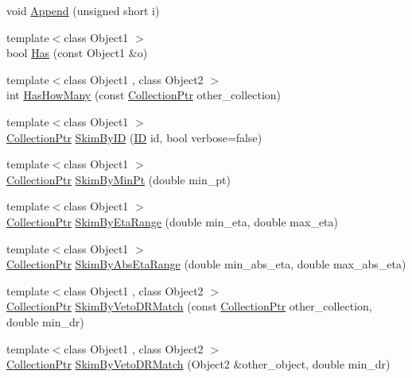 \begin{DoxyCompactItemize}
void \hyperlink{class_collection_a512ec1402a91a4af0ba696cc66f6f6fc}{Append} (unsigned short i)
\item 
{\footnotesize template$<$class Object1 $>$ }\\bool \hyperlink{class_collection_a91f8f35f3a94dc82013a979c52ab7e42}{Has} (const Object1 \&o)
\item 
{\footnotesize template$<$class Object1 , class Object2 $>$ }\\int \hyperlink{class_collection_ad01ea641d18de312338c07ce9ff1c109}{Has\+How\+Many} (const \hyperlink{_collection_8h_a64ea9217513944abee0afcb2ee82d787}{Collection\+Ptr} other\+\_\+collection)
\item 
{\footnotesize template$<$class Object1 $>$ }\\\hyperlink{_collection_8h_a64ea9217513944abee0afcb2ee82d787}{Collection\+Ptr} \hyperlink{class_collection_a1747c3817ab4fcf378c7cb90f4be59ca}{Skim\+By\+I\+D} (\hyperlink{_i_d_types_8h_a094c367727273b4da2b960ca3b3edc06}{I\+D} id, bool verbose=false)
\item 
{\footnotesize template$<$class Object1 $>$ }\\\hyperlink{_collection_8h_a64ea9217513944abee0afcb2ee82d787}{Collection\+Ptr} \hyperlink{class_collection_a5bcdc6dda7ac3de1789a93c9f7779883}{Skim\+By\+Min\+Pt} (double min\+\_\+pt)
\item 
{\footnotesize template$<$class Object1 $>$ }\\\hyperlink{_collection_8h_a64ea9217513944abee0afcb2ee82d787}{Collection\+Ptr} \hyperlink{class_collection_a5f1b6cfa200f5c288505983a678b5a96}{Skim\+By\+Eta\+Range} (double min\+\_\+eta, double max\+\_\+eta)
\item 
{\footnotesize template$<$class Object1 $>$ }\\\hyperlink{_collection_8h_a64ea9217513944abee0afcb2ee82d787}{Collection\+Ptr} \hyperlink{class_collection_aa9e4e2eb09a5a42dadb09c24f6ac22a9}{Skim\+By\+Abs\+Eta\+Range} (double min\+\_\+abs\+\_\+eta, double max\+\_\+abs\+\_\+eta)
\item 
{\footnotesize template$<$class Object1 , class Object2 $>$ }\\\hyperlink{_collection_8h_a64ea9217513944abee0afcb2ee82d787}{Collection\+Ptr} \hyperlink{class_collection_aae28a34d3dea752c6ca9c9ca01761226}{Skim\+By\+Veto\+D\+R\+Match} (const \hyperlink{_collection_8h_a64ea9217513944abee0afcb2ee82d787}{Collection\+Ptr} other\+\_\+collection, double min\+\_\+dr)
\item 
{\footnotesize template$<$class Object1 , class Object2 $>$ }\\\hyperlink{_collection_8h_a64ea9217513944abee0afcb2ee82d787}{Collection\+Ptr} \hyperlink{class_collection_a70e65cca2101cee209172af86a90e536}{Skim\+By\+Veto\+D\+R\+Match} (Object2 \&other\+\_\+object, double min\+\_\+dr)

\end{DoxyCompactItemize}
